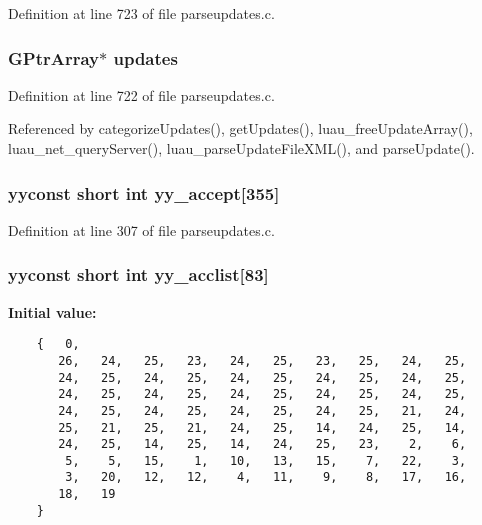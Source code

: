 Definition at line 723 of file parseupdates.c.
\subsubsection{\setlength{\rightskip}{0pt plus 5cm}GPtr\-Array$\ast$ {\bf updates}}\label{parseupdates_8c_a88}




Definition at line 722 of file parseupdates.c.

Referenced by categorize\-Updates(), get\-Updates(), luau\_\-free\-Update\-Array(), luau\_\-net\_\-query\-Server(), luau\_\-parse\-Update\-File\-XML(), and parse\-Update().
\subsubsection{\setlength{\rightskip}{0pt plus 5cm}yyconst short int {\bf yy\_\-accept}[355]\hspace{0.3cm}{\tt  [static]}}\label{parseupdates_8c_a77}




Definition at line 307 of file parseupdates.c.
\subsubsection{\setlength{\rightskip}{0pt plus 5cm}yyconst short int {\bf yy\_\-acclist}[83]\hspace{0.3cm}{\tt  [static]}}\label{parseupdates_8c_a76}


{\bf Initial value:}

\footnotesize\begin{verbatim}
    {   0,
       26,   24,   25,   23,   24,   25,   23,   25,   24,   25,
       24,   25,   24,   25,   24,   25,   24,   25,   24,   25,
       24,   25,   24,   25,   24,   25,   24,   25,   24,   25,
       24,   25,   24,   25,   24,   25,   24,   25,   21,   24,
       25,   21,   25,   21,   24,   25,   14,   24,   25,   14,
       24,   25,   14,   25,   14,   24,   25,   23,    2,    6,
        5,    5,   15,    1,   10,   13,   15,    7,   22,    3,
        3,   20,   12,   12,    4,   11,    9,    8,   17,   16,
       18,   19
    }
\end{verbatim}\normalsize 


